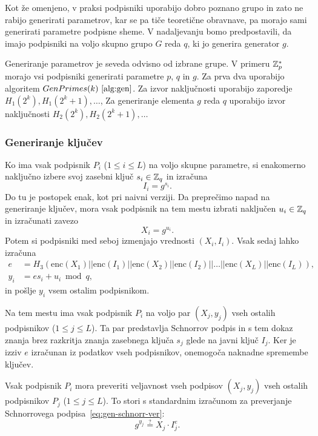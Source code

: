 Kot že omenjeno, v praksi podpisniki uporabijo dobro poznano grupo in zato ne rabijo generirati
parametrov, kar se pa tiče teoretične obravnave, pa morajo sami generirati parametre podpisne sheme.
V nadaljevanju bomo predpostavili, da imajo podpisniki na voljo skupno grupo $G$ reda $q$, ki jo
generira generator $g$.

\begin{primer}
    Generiranje parametrov je seveda odvisno od izbrane grupe. V primeru $\mathbb Z_p^*$ morajo vsi podpisniki
    generirati parametre $p$, $q$ in $g$. Za prva dva uporabijo algoritem $GenPrimes(k)~\ref{alg:gen}$.
    Za izvor naključnosti uporabijo zaporedje $H_1(2^k), H_1(2^k + 1), \dots$, Za generiranje elementa
    $g$ reda $q$ uporabijo izvor naključnosti $H_2(2^k), H_2(2^k + 1), \dots$
\end{primer}

\subsubsection{Generiranje ključev}
Ko ima vsak podpisnik $P_i$ ($1 \le i \le L$) na voljo skupne parametre, si enakomerno naključno
izbere svoj zasebni ključ $s_i \in \mathbb Z_q$ in izračuna
$$ 
I_i = g^{s_i}.
$$
Do tu je postopek enak, kot pri naivni verziji. Da preprečimo napad na generiranje ključev, mora
vsak podpisnik na tem mestu izbrati naključen $u_i \in \mathbb Z_q$ in izračunati zavezo
$$
X_i = g^{u_i}.
$$
Potem si podpisniki med seboj izmenjajo vrednosti $(X_i, I_i)$. Vsak sedaj lahko izračuna
\begin{align*}
    e &= H_3(\text{enc}(X_1) || \text{enc}(I_1) || \text{enc}(X_2) || \text{enc}(I_2) || \dots || \text{enc}(X_L) || \text{enc}(I_L)), \\
    y_i &= e s_i + u_i \bmod q,
\end{align*}
in pošlje $y_i$ vsem ostalim podpisnikom.

Na tem mestu ima vsak podpisnik $P_i$ na voljo par $(X_j, y_j)$ vseh ostalih podpisnikov ($1 \le j
\le L$). Ta par predstavlja Schnorrov podpis in s tem dokaz znanja brez razkritja znanja zasebnega
ključa $s_j$ glede na javni ključ $I_j$. Ker je izziv $e$ izračunan iz podatkov vseh podpisnikov,
onemogoča naknadne spremembe ključev.

Vsak podpisnik $P_i$ mora preveriti veljavnost vseh podpisov $(X_j, y_j)$ vseh ostalih podpisnikov
$P_j$ ($1 \le j \le L$). To stori s standardnim izračunom za preverjanje Schnorrovega
podpisa~\eqref{eq:gen-schnorr-ver}:
$$
g^{y_j} \stackrel{?}{=} X_j \cdot I_j^{e}.
$$

